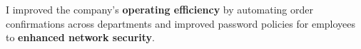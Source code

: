 \documentclass[]{jonas-cv}
\begin{document}
\begin{minipage}[t]{0.63\textwidth}

\begin{tightemize}
    \item [\angleDoubleRightSymbol] I improved the company's \textbf{operating efficiency} by automating order confirmations across departments and improved password policies for employees to \textbf{enhanced network security}.
\end{tightemize}
\largesectionsep

\tinysectionsep






\end{minipage}
\end{document}
